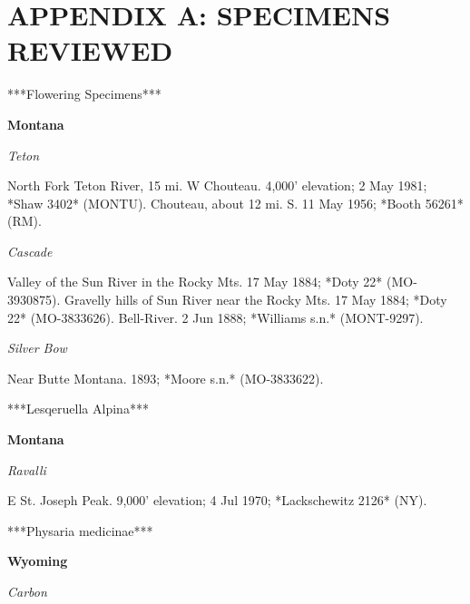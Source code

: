 \chapter*{APPENDIX A: SPECIMENS REVIEWED}


***Flowering Specimens***

\textbf{Montana} 

\textit{Teton}

North Fork Teton River, 15 mi. W Chouteau. 4,000' elevation; 2 May 1981; *Shaw 3402* (MONTU).  Chouteau, about 12 mi. S. 11 May 1956; *Booth 56261* (RM).  

\textit{Cascade}

Valley of the Sun River in the Rocky Mts. 17 May 1884; *Doty 22* (MO-3930875).  Gravelly hills of Sun River near the Rocky Mts. 17 May 1884; *Doty 22* (MO-3833626).  Bell-River. 2 Jun 1888; *Williams s.n.* (MONT-9297).  

\textit{Silver Bow}

Near Butte Montana. 1893; *Moore s.n.* (MO-3833622). 

***Lesqeruella Alpina***

\textbf{Montana} 

\textit{Ravalli}

E St. Joseph Peak. 9,000' elevation; 4 Jul 1970; *Lackschewitz 2126* (NY).  


***Physaria medicinae***

\textbf{Wyoming} 

\textit{Carbon}

